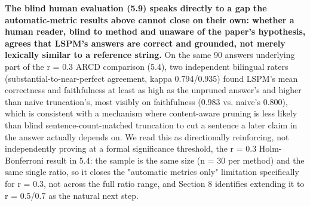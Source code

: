 \textbf{The blind human evaluation (5.9) speaks directly to a gap the automatic-metric results above cannot close on their own: whether a human reader, blind to method and unaware of the paper's hypothesis, agrees that LSPM's answers are correct and grounded, not merely lexically similar to a reference string.} On the same 90 answers underlying part of the r = 0.3 ARCD comparison (5.4), two independent bilingual raters (substantial-to-near-perfect agreement, kappa 0.794/0.935) found LSPM's mean correctness and faithfulness at least as high as the unpruned answer's and higher than naive truncation's, most visibly on faithfulness (0.983 vs. naive's 0.800), which is consistent with a mechanism where content-aware pruning is less likely than blind sentence-count-matched truncation to cut a sentence a later claim in the answer actually depends on. We read this as directionally reinforcing, not independently proving at a formal significance threshold, the r = 0.3 Holm-Bonferroni result in 5.4: the sample is the same size (n = 30 per method) and the same single ratio, so it closes the "automatic metrics only" limitation specifically for r = 0.3, not across the full ratio range, and Section 8 identifies extending it to r = 0.5/0.7 as the natural next step.

